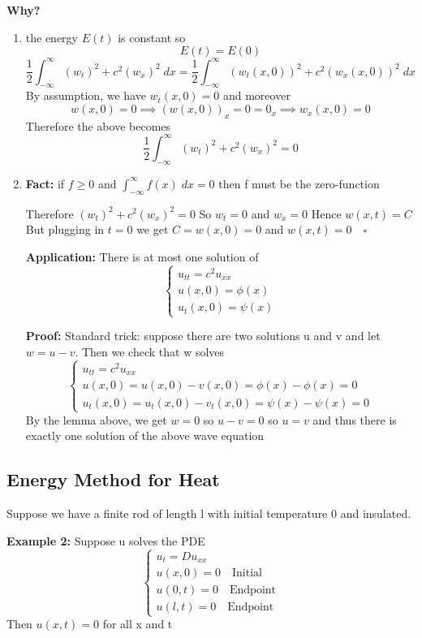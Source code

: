 \documentclass[12pt]{article}
\begin{document}
\textbf{Why?}
\begin{enumerate}
    \item the energy $E(t)$ is constant so 
    \[E(t) = E(0)\]
    \[\frac{1}{2} \int_{-\infty}^{\infty} (w_t)^2 + c^2 (w_x)^2 \; dx = \frac{1}{2} \int_{-\infty}^{\infty} (w_t(x, 0))^2 + c^2(w_x(x, 0))^2\; dx\]
    By assumption, we have $w_t(x, 0) = 0$ and moreover
    \[w(x, 0) = 0 \implies (w(x, 0))_x = 0 = 0_x \implies w_x(x, 0) = 0\]
    Therefore the above becomes 
    \[\frac{1}{2}\int_{-\infty}^{\infty} (w_t)^2 + c^2(w_x)^2 = 0\]

    \item 
    \textbf{Fact:} if $f \geq 0$ and $\int_{-\infty}^{\infty} f(x)\; dx = 0$ then f must be the zero-function  

    Therefore $(w_t)^2 + c^2(w_x)^2 = 0$ 
    So $w_t = 0$ and $w_x = 0$
    Hence $w(x, t) = C$
    But plugging in $t= 0$ we get $C = w(x, 0) = 0$ and $w(x, t) = 0 \quad \square$

    \textbf{Application:}
    There is at most one solution of 
    \[\begin{cases}
        u_{tt} = c^2 u_{xx}\\
        u(x, 0) = \phi(x)\\
        u_t(x, 0) = \psi(x)
    \end{cases}\]

    \textbf{Proof:}
    Standard trick: suppose there are two solutions u and v and let $w = u - v$. Then we check that w solves 
    \[\begin{cases}
        u_{tt} = c^2 u_{xx}\\
        u(x, 0) = u(x, 0) - v(x, 0) = \phi(x) - \phi(x) = 0\\
        u_t(x, 0) = u_t(x, 0) - v_t(x, 0) = \psi(x) - \psi(x) = 0
    \end{cases}\]
    By the lemma above, we get $w = 0$ so $u-v=0$ so $u=v$
    and thus there is exactly one solution of the above wave equation
\end{enumerate}

\subsection*{Energy Method for Heat}
Suppose we have a finite rod of length l with initial temperature 0 and insulated. 

\textbf{Example 2:} 
Suppose u solves the PDE
\[\begin{cases}
    u_t = Du_{xx}\\
    u(x, 0) = 0\quad \text{Initial}\\
    u(0, t) = 0\quad \text{Endpoint}\\
    u(l, t) = 0\quad \text{Endpoint}
\end{cases}\]
Then $u(x, t) = 0$ for all x and t 
\end{document}
